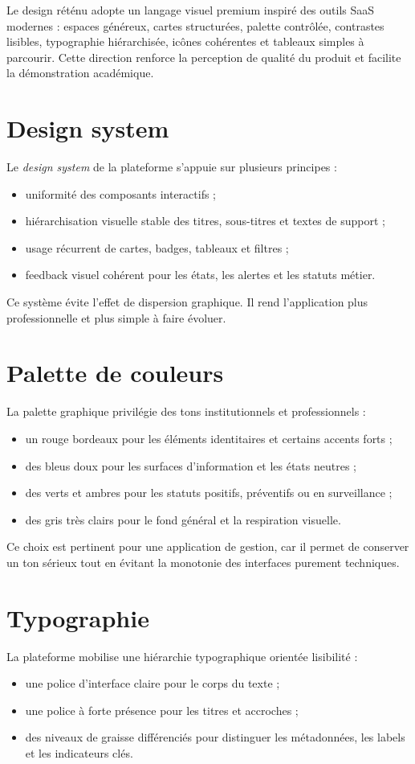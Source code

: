﻿\documentclass[12pt,a4paper,oneside]{report}
\begin{document}
Le design réténu adopte un langage visuel premium inspiré des outils SaaS modernes : espaces généreux, cartes structurées, palette contrôlée, contrastes lisibles, typographie hiérarchisée, icônes cohérentes et tableaux simples à parcourir. Cette direction renforce la perception de qualité du produit et facilite la démonstration académique.

\section{Design system}
Le \textit{design system} de la plateforme s'appuie sur plusieurs principes :
\begin{itemize}
  \item uniformité des composants interactifs ;
  \item hiérarchisation visuelle stable des titres, sous-titres et textes de support ;
  \item usage récurrent de cartes, badges, tableaux et filtres ;
  \item feedback visuel cohérent pour les états, les alertes et les statuts métier.
\end{itemize}

Ce système évite l'effet de dispersion graphique. Il rend l'application plus professionnelle et plus simple à faire évoluer.

\section{Palette de couleurs}
La palette graphique privilégie des tons institutionnels et professionnels :
\begin{itemize}
  \item un rouge bordeaux pour les éléments identitaires et certains accents forts ;
  \item des bleus doux pour les surfaces d'information et les états neutres ;
  \item des verts et ambres pour les statuts positifs, préventifs ou en surveillance ;
  \item des gris très clairs pour le fond général et la respiration visuelle.
\end{itemize}

Ce choix est pertinent pour une application de gestion, car il permet de conserver un ton sérieux tout en évitant la monotonie des interfaces purement techniques.

\section{Typographie}
La plateforme mobilise une hiérarchie typographique orientée lisibilité :
\begin{itemize}
  \item une police d'interface claire pour le corps du texte ;
  \item une police à forte présence pour les titres et accroches ;
  \item des niveaux de graisse différenciés pour distinguer les métadonnées, les labels et les indicateurs clés.
\end{itemize}
\end{document}
